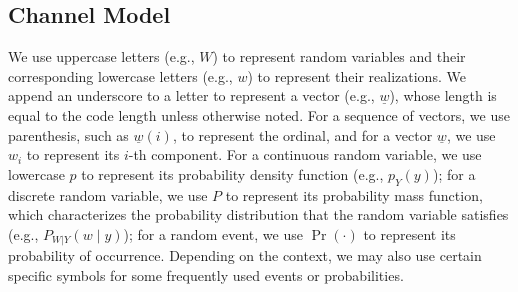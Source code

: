 \documentclass[letterpaper,draftclsnofoot,onecolumn]{IEEEtran}
\begin{document}

\subsection{Channel Model}\label{SubSec:basic_channel_model}

We use uppercase letters (e.g., $W$) to represent random variables and their corresponding lowercase letters (e.g., $w$) to represent their realizations. We append an underscore to a letter to represent a vector (e.g., $\underline{w}$), whose length is equal to the code length unless otherwise noted. For a sequence of vectors, we use parenthesis, such as $\underline{w}(i)$, to represent the ordinal, and for a vector $\underline{w}$, we use $w_i$ to represent its $i$-th component. For a continuous random variable, we use lowercase $p$ to represent its probability density function (e.g., $p_{Y}(y)$); for a discrete random variable, we use $P$ to represent its probability mass function, which characterizes the probability distribution that the random variable satisfies (e.g., $P_{W|Y}(w \mid y)$); for a random event, we use $\Pr(\cdot)$ to represent its probability of occurrence. Depending on the context, we may also use certain specific symbols for some frequently used events or probabilities.
\end{document}
